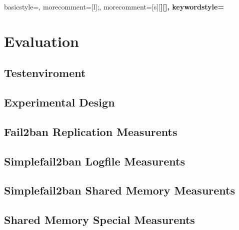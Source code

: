 %
{
  basicstyle=\ttfamily\footnotesize,
  morecomment=[l]{;},
  morecomment=[s][\bfseries]{[}{]},
  keywordstyle={\bfseries}
}
%
\lstset{%
basicstyle=\ttfamily\footnotesize,
breaklines = true,
tabsize=2,
numbers=left,xleftmargin=2em,%
}
\chapter{Evaluation}

\section{Testenviroment}

\section{Experimental Design}

\section{Fail2ban Replication Measurents}

\section{Simplefail2ban Logfile Measurents}

\section{Simplefail2ban Shared Memory Measurents}

\section{Shared Memory Special Measurents}
